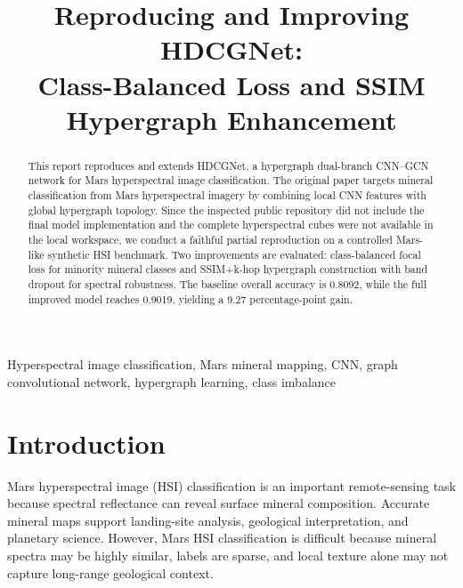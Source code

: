 \documentclass[conference]{IEEEtran}
\begin{document}
\title{
    Reproducing and Improving HDCGNet:\\
    Class-Balanced Loss and SSIM Hypergraph Enhancement
}

\author{
}

\maketitle

\begin{abstract}
This report reproduces and extends HDCGNet, a hypergraph dual-branch CNN--GCN network for Mars hyperspectral image classification. The original paper targets mineral classification from Mars hyperspectral imagery by combining local CNN features with global hypergraph topology. Since the inspected public repository did not include the final model implementation and the complete hyperspectral cubes were not available in the local workspace, we conduct a faithful partial reproduction on a controlled Mars-like synthetic HSI benchmark. Two improvements are evaluated: class-balanced focal loss for minority mineral classes and SSIM+k-hop hypergraph construction with band dropout for spectral robustness. The baseline overall accuracy is 0.8092, while the full improved model reaches 0.9019, yielding a 9.27 percentage-point gain.
\end{abstract}

\begin{IEEEkeywords}
Hyperspectral image classification, Mars mineral mapping, CNN, graph convolutional network, hypergraph learning, class imbalance
\end{IEEEkeywords}

\section{Introduction}
Mars hyperspectral image (HSI) classification is an important remote-sensing task because spectral reflectance can reveal surface mineral composition. Accurate mineral maps support landing-site analysis, geological interpretation, and planetary science. However, Mars HSI classification is difficult because mineral spectra may be highly similar, labels are sparse, and local texture alone may not capture long-range geological context.
\end{document}
